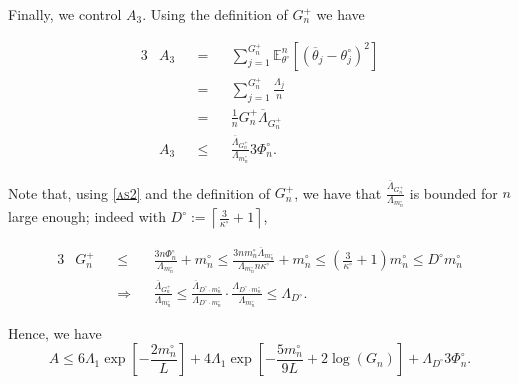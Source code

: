\medskip

Finally, we control $A_{3}.$
Using the definition of $G_{n}^{+}$ we have

\begin{alignat*}{3}
& A_{3} &&=&& \sum\limits_{j = 1}^{G_{n}^{+}} \mathds{E}_{\theta^{\circ}}^{n}\left[\left(\overline{\theta}_{j} - \theta^{\circ}_{j}\right)^{2}\right]\\
& &&=&& \sum\limits_{j = 1}^{G_{n}^{+}} \frac{\Lambda_{j}}{n}\\
& &&=&& \frac{1}{n} G_{n}^{+} \overline{\Lambda}_{G_{n}^{+}}\\
&A_{3} &&\leq&& \frac{\overline{\Lambda}_{G_{n}^{+}}}{\Lambda_{m_{n}^{\circ}}} 3 \Phi_{n}^{\circ}.
\end{alignat*}

Note that, using \textsc{\cref{as2}} and the definition of $G_{n}^{+}$, we have that $\frac{\overline{\Lambda}_{G_{n}^{+}}}{\Lambda_{m_{n}^{\circ}}}$ is bounded for $n$ large enough; indeed with $D^{\circ} := \left\lceil \frac{3}{\kappa^{\circ}} + 1\right\rceil$,

\begin{alignat*}{3}
& G_{n}^{+} && \leq && \frac{3 n \Phi_{n}^{\circ}}{\Lambda_{m_{n}^{\circ}}} + m_{n}^{\circ} \leq \frac{3 n m_{n}^{\circ} \overline{\Lambda}_{m_{n}^{\circ}}}{\Lambda_{m_{n}^{\circ}} n \kappa^{\circ}} + m_{n}^{\circ} \leq \left(\frac{3}{\kappa^{\circ}} + 1\right) m_{n}^{\circ} \leq D^{\circ} m_{n}^{\circ}\\ 
& &&\Rightarrow&& \frac{\overline{\Lambda}_{G_{n}^{+}}}{\Lambda_{m_{n}^{\circ}}}\leq \frac{\overline{\Lambda}_{D^{\circ} \cdot m_{n}^{\circ}}}{\Lambda_{D^{\circ} \cdot m_{n}^{\circ}}} \cdot \frac{\Lambda_{D^{\circ} \cdot m_{n}^{\circ}}}{\Lambda_{m_{n}^{\circ}}} \leq \Lambda_{D^{\circ}}.
\end{alignat*}

\medskip

Hence, we have
\[A \leq 6 \Lambda_{1} \exp\left[- \frac{2 m_{n}^{\circ}}{L}\right] + 4 \Lambda_{1} \exp\left[-\frac{5 m_{n}^{\circ}}{9 L} + 2 \log \left(G_{n}\right)\right] +  \Lambda_{D^{\circ}} 3 \Phi_{n}^{\circ}.\]

\bigskip

